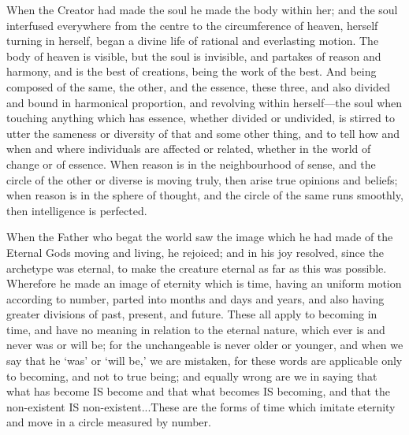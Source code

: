 When the Creator had made the soul he made the body within her; and the
soul interfused everywhere from the centre to the circumference of heaven,
herself turning in herself, began a divine life of rational and
everlasting motion. The body of heaven is visible, but the soul is
invisible, and partakes of reason and harmony, and is the best of
creations, being the work of the best. And being composed of the same, the
other, and the essence, these three, and also divided and bound in
harmonical proportion, and revolving within herself—the soul when
touching anything which has essence, whether divided or undivided, is
stirred to utter the sameness or diversity of that and some other thing,
and to tell how and when and where individuals are affected or related,
whether in the world of change or of essence. When reason is in the
neighbourhood of sense, and the circle of the other or diverse is moving
truly, then arise true opinions and beliefs; when reason is in the sphere
of thought, and the circle of the same runs smoothly, then intelligence is
perfected.

When the Father who begat the world saw the image which he had made of the
Eternal Gods moving and living, he rejoiced; and in his joy resolved,
since the archetype was eternal, to make the creature eternal as far as
this was possible. Wherefore he made an image of eternity which is time,
having an uniform motion according to number, parted into months and days
and years, and also having greater divisions of past, present, and future.
These all apply to becoming in time, and have no meaning in relation to
the eternal nature, which ever is and never was or will be; for the
unchangeable is never older or younger, and when we say that he ‘was’ or
‘will be,’ we are mistaken, for these words are applicable only to
becoming, and not to true being; and equally wrong are we in saying that
what has become IS become and that what becomes IS becoming, and that the
non-existent IS non-existent...These are the forms of time which imitate
eternity and move in a circle measured by number.

